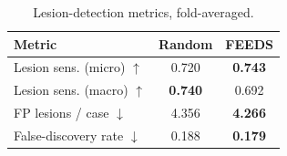 \begin{table}[t]
\centering
\caption{Lesion-detection metrics, fold-averaged.}
\label{tab:lesion_extended}
\begin{tabular}{lcc}
\toprule
Metric & Random & FEEDS \\
\midrule
Lesion sens. (micro) $\uparrow$ & 0.720 & \textbf{0.743} \\
Lesion sens. (macro) $\uparrow$ & \textbf{0.740} & 0.692 \\
FP lesions / case $\downarrow$ & 4.356 & \textbf{4.266} \\
False-discovery rate $\downarrow$ & 0.188 & \textbf{0.179} \\
\bottomrule
\end{tabular}
\end{table}